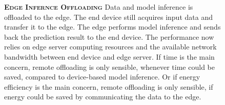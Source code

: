 \begin{figure}
	\begin{minipage}{0.3\linewidth}
		\centering
		\begin{figure}
			\centering
			\captionsetup[subfigure]{justification=centering}
		\end{figure}
	\end{minipage}
	\hfill
	\begin{minipage}{0.65\linewidth}
		\textbf{\protect{} \textsc{Edge Infernce Offloading}}
		\color{caption-color} \newline
		Data and model inference is offloaded to the edge. The end device still acquires input data and transfer it to the edge. The edge performs model inference and sends back the prediction result to the end device. The performance now relies on edge server computing resources and the available network bandwidth between end device and edge server. If time is the main concern, remote offloading is only sensible, whenever time could be saved, compared to device-based model inference. Or if energy efficiency is the main concern, remote offloading is only sensible, if energy could be saved by communicating the data to the edge. 
	\end{minipage}
\end{figure}

